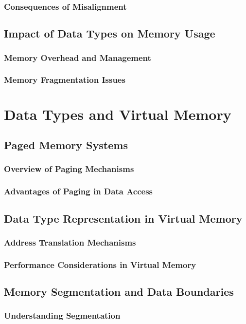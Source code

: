 \documentclass[12pt, oneside]{book}
\begin{document}
\subsubsection{Consequences of Misalignment}
\subsection{Impact of Data Types on Memory Usage}
\subsubsection{Memory Overhead and Management}
\subsubsection{Memory Fragmentation Issues}
\section{Data Types and Virtual Memory}
\subsection{Paged Memory Systems}
\subsubsection{Overview of Paging Mechanisms}
\subsubsection{Advantages of Paging in Data Access}
\subsection{Data Type Representation in Virtual Memory}
\subsubsection{Address Translation Mechanisms}
\subsubsection{Performance Considerations in Virtual Memory}
\subsection{Memory Segmentation and Data Boundaries}
\subsubsection{Understanding Segmentation}
\end{document}
